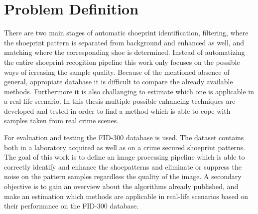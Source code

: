 \documentclass[draft,final]{vutinfth} %
\begin{document}
\section{Problem Definition}
\par
There are two main stages of automatic shoeprint identification, filtering, where the shoeprint pattern is separated from background and enhanced as well, and matching where the corresponding shoe is determined.
Instead of automatizing the entire shoeprint recogition pipeline this work only focuses on the possible ways of icreasing the sample quality.
Because of the mentioned absence of general, appropiate database it is difficult to compare the already available methods.
Furthermore it is also challanging to estimate which one is applicable in a real-life scenario.
In this thesis multiple possible enhancing techniques are developed and tested in order to find a method which is able to cope with samples taken from real crime scenes.
\par
For evaluation and testing the FID-300 database is used.
The dataset contains both in a laboratory acquired as well as on a crime secured shoeprint patterns.
The goal of this work is to define an image processing pipeline which is able to correctly identify and enhance the shoepatterns and eliminate or suppress the noise on the pattern samples regardless the quality of the image.
A secondary objective is to gain an overview about the algorithms already published, and make an estimation which methods are applicable in real-life scenarios based on their performance on the FID-300 database.
\end{document}
